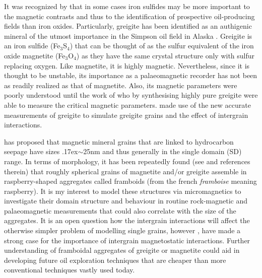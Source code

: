 It was recognized by \citet{Reynolds} that in some cases iron sulfides may be more important to the magnetic contrasts and thus to the identification of prospective oil-producing fields than iron oxides. Particularly, greigite has been identified as an authigenic mineral of the utmost importance in the Simpson oil field in Alaska \citep{Reynolds}. Greigite is an iron sulfide (Fe$_3$S$_4$) that can be thought of as the sulfur equivalent of the iron oxide magnetite (Fe$_3$O$_4$) as they have the same crystal structure only with sulfur replacing oxygen. Like magnetite, it is highly magnetic. Nevertheless, since it is thought to be unstable, its importance as a palaeomagnetic recorder has not been as readily realized as that of magnetite. Also, its magnetic parameters were poorly understood until the work of \citet{Chang} who by synthesising highly pure greigite were able to measure the critical magnetic parameters. \citet{Mxwt1} made use of the new accurate measurements of greigite to simulate greigite grains and the effect of intergrain interactions.\par

\citet{Liu} has proposed that magnetic mineral grains that are linked to hydrocarbon seepage have sizes {\raise.17ex\hbox{$\scriptstyle\sim$}}25nm and thus generally in the single domain (SD) range. In terms of morphology, it has been repeatedly found (see \citet{Aldana} and references therein) that roughly spherical grains of magnetite and/or greigite assemble in raspberry-shaped aggregates called framboids (from the french \textit{framboise} meaning raspberry). It is my interest to model these structures via micromagnetics to investigate their domain structure and behaviour in routine rock-magnetic and palaeomagnetic measurements that could also correlate with the size of the aggregates. It is an open question how the intergrain interactions will affect the otherwise simpler problem of modelling single grains, however \citet{Mxwt2}, \citet{Mxwt1} have made a strong case for the importance of intergrain magnetostatic interactions. Further understanding of framboidal aggregates of greigite or magnetite could aid in developing future oil exploration techniques that are cheaper than more conventional techniques vastly used today.\par